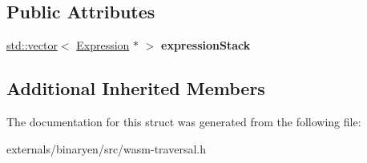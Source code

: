 \subsection*{Public Attributes}
\begin{DoxyCompactItemize}
\item 
\mbox{\label{structwasm_1_1_expression_stack_walker_abf06acdd4ac4a2d447df35909b01ff01}} 
\mbox{\hyperlink{classstd_1_1vector}{std\+::vector}}$<$ \mbox{\hyperlink{classwasm_1_1_expression}{Expression}} $\ast$ $>$ {\bfseries expression\+Stack}
\end{DoxyCompactItemize}
\subsection*{Additional Inherited Members}


The documentation for this struct was generated from the following file\+:\begin{DoxyCompactItemize}
\item 
externals/binaryen/src/wasm-\/traversal.\+h\end{DoxyCompactItemize}
